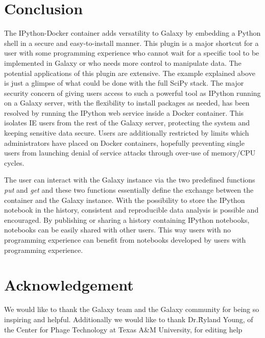\documentclass{bioinfo}
\begin{document}
\section{Conclusion}
The IPython-Docker container adds versatility to Galaxy by embedding a Python shell in a secure and easy-to-install manner.
This plugin is a major shortcut for a user with some programming experience who cannot wait for a specific tool to
be implemented in Galaxy or who needs more control to manipulate data. The potential applications of this plugin are extensive.
The example explained above is just a glimpse of what could be done with the full SciPy stack. The major security concern
of giving users access to such a powerful tool as IPython running on a Galaxy server, with the flexibility to install
packages as needed, has been resolved by running the IPython web service inside a Docker container. This 
isolates IE users from the rest of the Galaxy server, protecting the system and keeping sensitive data secure.
Users are additionally restricted by limits which administrators have placed on Docker containers,
hopefully preventing single users from launching denial of service attacks through over-use of memory/CPU cycles.

The user can interact with the Galaxy instance via the two predefined functions \textit{put} and \textit{get} and these two
functions essentially define the exchange between the container and the Galaxy instance. With the possibility to store the
IPython notebook in the history, consistent and reproducible data analysis is possible and encouraged. 
By publishing or sharing a history containing IPython notebooks, notebooks can be easily shared with other users.
This way users with no programming experience can benefit from notebooks developed by users with programming experience.



\section*{Acknowledgement}
We would like to thank the Galaxy team and the Galaxy community for being so inspiring and helpful. 
Additionally we would like to thank Dr.\~Ryland Young, of the Center for Phage Technology at Texas A\&M University, for editing help
\end{document}
